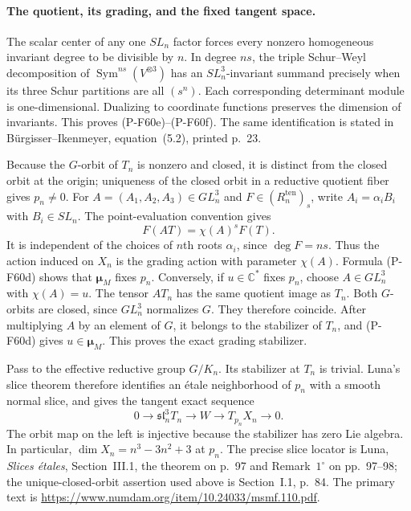\paragraph{The quotient, its grading, and the fixed tangent space.}
The scalar center of any one $SL_n$ factor forces every
nonzero homogeneous invariant degree to be divisible
by $n$.  In degree $ns$, the triple Schur--Weyl
decomposition of $\operatorname{Sym}^{ns}(V^{\otimes3})$
has an $SL_n^3$-invariant summand precisely when its
three Schur partitions are all $(s^n)$.  Each corresponding
determinant module is one-dimensional.  Dualizing to
coordinate functions preserves the dimension of invariants.
This proves (P-F60e)--(P-F60f).  The same identification
is stated in B\"urgisser--Ikenmeyer, equation~(5.2),
printed p.~23.

Because the $G$-orbit of $T_n$ is nonzero and closed,
it is distinct from the closed orbit at the origin;
uniqueness of the closed orbit in a reductive quotient
fiber gives $p_n\ne0$.  For $A=(A_1,A_2,A_3)\in GL_n^3$
and $F\in(R^{\mathrm{ten}}_n)_s$, write
$A_i=\alpha_i B_i$ with $B_i\in SL_n$.
The point-evaluation convention gives
\[
                   F(AT)=\chi(A)^s F(T).                \tag{P-F60l}
\]
It is independent of the choices of $n$th roots
$\alpha_i$, since $\deg F=ns$.  Thus the action induced
on $X_n$ is the grading action with parameter $\chi(A)$.
Formula (P-F60d) shows that $\boldsymbol\mu_M$ fixes
$p_n$.  Conversely, if $u\in\mathbb C^*$ fixes $p_n$,
choose $A\in GL_n^3$ with $\chi(A)=u$.
The tensor $AT_n$ has the same quotient image as $T_n$.
Both $G$-orbits are closed, since $GL_n^3$ normalizes $G$.
They therefore coincide.  After multiplying $A$ by an
element of $G$, it belongs to the stabilizer of $T_n$,
and (P-F60d) gives $u\in\boldsymbol\mu_M$.  This proves
the exact grading stabilizer.

Pass to the effective reductive group $G/K_n$.
Its stabilizer at $T_n$ is trivial.  Luna's slice theorem
therefore identifies an \'etale neighborhood of $p_n$
with a smooth normal slice, and gives the tangent
exact sequence
\[
 0\longrightarrow\mathfrak{sl}_n^3 T_n
     \longrightarrow W\longrightarrow T_{p_n}X_n
       \longrightarrow0.                              \tag{P-F60m}
\]
The orbit map on the left is injective because the
stabilizer has zero Lie algebra.  In particular,
$\dim X_n=n^3-3n^2+3$ at $p_n$.
The precise slice locator is Luna, \emph{Slices \'etales},
Section~III.1, the theorem on p.~97 and Remark~$1^\circ$
on pp.~97--98; the unique-closed-orbit assertion used
above is Section~I.1, p.~84.
The primary text is
\url{https://www.numdam.org/item/10.24033/msmf.110.pdf}.

